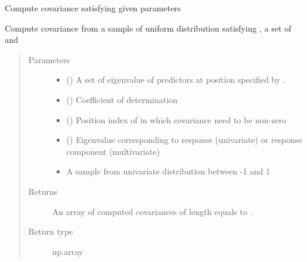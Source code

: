 \documentclass[letterpaper,10pt,english]{sphinxmanual}
\begin{document}

\begin{fulllineitems}
\label{\detokenize{Utilities:pysimrel.utilities.sample_cov}}
Compute covariance satisfying given parameters

Compute covariance from a sample of uniform distribution satisfying , a set of  and 
\begin{quote}\begin{description}
\item[{Parameters}] \leavevmode\begin{itemize}
\item {} 
 () \textendash{} A set of eigenvalue of predictors at position specified by .

\item {} 
 () \textendash{} Coefficient of determination

\item {} 
 () \textendash{} Position index of in which covariance need to be non-zero

\item {} 
 () \textendash{} Eigenvalue corresponding to response (univariate) or response component (multivariate)

\item {} 
 \textendash{} A sample from univariate distribution between -1 and 1

\end{itemize}

\item[{Returns}] \leavevmode
An array of computed covariances of length equals to .

\item[{Return type}] \leavevmode
np.array

\end{description}\end{quote}

\end{fulllineitems}
\end{document}
